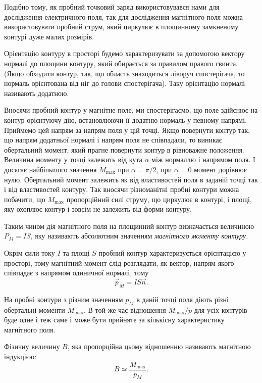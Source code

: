 Подібно тому, як пробний точковий заряд використовувався нами для дослідження електричного поля, так для дослідження магнітного поля можна використовувати пробний струм, який циркулює в площинному замкненому контурі дуже малих розмірів. \medskip

Орієнтацію контуру в просторі будемо характеризувати за допомогою вектору нормалі до площини контуру, який обирається за правилом правого гвинта. (Якщо обходити контур, так, що область знаходиться ліворуч спостерігача, то нормаль орієнтована від ніг до голови спостерігача). Таку орієнтацію нормалі називають додатною. \medskip

Вносячи пробний контур у магнітне поле, ми спостерігаємо, що поле здійснює на контур орієнтуючу дію, встановлюючи її додатню нормаль у певному напрямі. Приймемо цей напрям за напрям поля у цій точці. Якщо повернути контур так, що напрям додатньої нормалі і напрям поля не співпадали, то виникає обертальний момент, який прагне повернути контур в рівноважне положення. Величина моменту у точці залежить від кута $\alpha$ між нормаллю і напрямом поля. І досягає найбільшого значення $M_{\text{max}}$ при $\alpha = \pi / 2$, при $\alpha = 0$ момент дорівнює нулю. Обертальний момент залежить як від властивостей поля в заданій точці так і від властивостей контуру. Так вносячи різноманітні пробні контури можна побачити, що $M_{\text{max}}$ пропорційний силі струму, що циркулює в контурі, і площі, яку охоплює контур і зовсім не залежить від форми контуру. 

\begin{definition}
	Таким чином дія магнітного поля на площинний контур визначається величиною $P_M = I S$, яку називають абсолютним значенням \it{магнітного моменту контуру}.
\end{definition}

Окрім сили току $I$ та площі $S$ пробний контур характеризується орієнтацією у просторі, тому магнітний момент слід розглядати, як вектор, напрям якого співпадає з напрямом одиничної нормалі, тому
\begin{equation}
	\vec p_M = I S \vec n.
\end{equation}

На пробні контури з різним значенням $p_M$ в даній точці поля діють різні обертальні моменти $M_{\text{max}}$. В той же час відношення $M_{\text{max}} / p$ для усіх контурів буде одне і теж саме і може бути прийняте за кількісну характеристику магнітного поля. 

\begin{definition}[індукції]
	Фізичну величину $B$, яка пропорційна цьому відношенню називають магнітною індукцією:
	\begin{equation}
		B \simeq \frac{M_{\text{max}}}{p_M}.
	\end{equation}
\end{definition}

